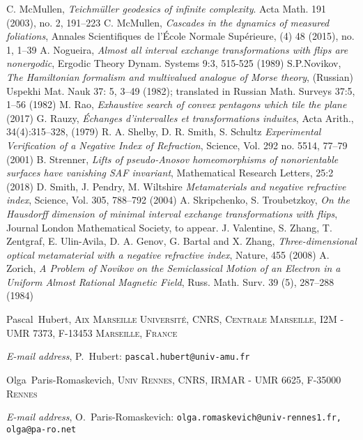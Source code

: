 \documentclass[12pt]{article}
\makeatletter
\theoremstyle{definition}
\newcommand{\Addresses}{{%
  \bigskip
  \footnotesize

  Pascal~Hubert, \textsc{Aix Marseille Universit\'e, CNRS, Centrale Marseille, I2M - UMR 7373, F-13453 Marseille, France}\par\nopagebreak
  \textit{E-mail address}, P.~Hubert: \texttt{pascal.hubert@univ-amu.fr}

  \medskip

  Olga~Paris-Romaskevich, \textsc{Univ Rennes, CNRS, IRMAR - UMR 6625, F-35000 Rennes}\par\nopagebreak
  \textit{E-mail address}, O.~Paris-Romaskevich: \texttt{olga.romaskevich@univ-rennes1.fr, olga@pa-ro.net}
}}
\makeatother
\begin{document}
\begin{thebibliography}{99}
 C. McMullen, \emph{Teichm\"uller geodesics of infinite complexity}. Acta Math. 191 (2003), no. 2, 191--223
 C. McMullen, \emph{Cascades in the dynamics of measured foliations}, Annales Scientifiques de l'École Normale Supérieure, (4) 48 (2015), no. 1, 1--39
 A. Nogueira, \emph{Almost all interval exchange transformations with flips are nonergodic}, Ergodic Theory Dynam. Systems 9:3, 515-525 (1989)
 S.P.Novikov, \emph{The Hamiltonian formalism and multivalued analogue of Morse theory},
(Russian) Uspekhi Mat. Nauk 37: 5, 3–49 (1982); translated in Russian Math. Surveys 37:5, 1–56 (1982)
 M. Rao, \emph{Exhaustive search of convex pentagons which tile the plane} (2017)
 G. Rauzy, \emph{Échanges d’intervalles et transformations induites}, Acta Arith., 34(4):315–328, (1979)
 R. A. Shelby, D. R. Smith, S. Schultz \emph{Experimental Verification of a Negative Index of Refraction}, Science, Vol. 292 no. 5514, 77–79 (2001)
 B. Strenner, \emph{Lifts of pseudo-Anosov homeomorphisms of nonorientable surfaces have vanishing SAF invariant}, Mathematical Research Letters, 25:2 (2018)
 D. Smith, J. Pendry, M. Wiltshire  \emph{Metamaterials and negative refractive index}, Science, Vol. 305, 788–792 (2004)
 A. Skripchenko, S. Troubetzkoy, \emph{On the Hausdorff dimension of minimal interval exchange transformations with flips}, Journal London Mathematical Society, to appear.
 J. Valentine, S. Zhang, T. Zentgraf, E. Ulin-Avila, D. A. Genov, G. Bartal and X. Zhang, \emph{Three-dimensional optical metamaterial with a negative refractive index}, Nature, 455 (2008)
 A. Zorich, \emph{A Problem of Novikov on the Semiclassical Motion of an Electron in a Uniform Almost Rational Magnetic Field}, Russ. Math. Surv. 39 (5), 287–288 (1984)
\end{thebibliography}

\Addresses
\end{document}
